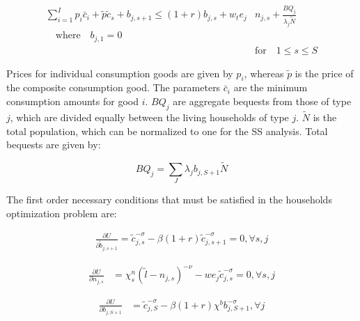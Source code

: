 \documentclass[letterpaper,12pt]{article}
\theoremstyle{definition}
\begin{document}
\begin{spacing}{1.5}
     \begin{equation}\label{EqBC}
      \begin{split}
        \sum_{i=1}^{I} p_{i}\bar{c}_{i} + \tilde{p}\tilde{c}_{s} + b_{j,s+1} \leq \left(1 + r\right) b_{j,s} + w_t e_{j}&n_{j,s} + \frac{BQ_{j}}{\lambda_j\tilde{N}} \\
        \quad\text{where}\quad b_{j,1} = 0 \\
        &\text{for} \quad 1\leq s \leq S 
      \end{split}
    \end{equation}
    
  Prices for individual consumption goods are given by $p_{i}$, whereas $\tilde{p}$ is the price of the composite consumption good.  The parameters $\bar{c}_{i}$ are the minimum consumption amounts for good $i$.  $BQ_{j}$ are aggregate bequests from those of type $j$, which are divided equally between the living households of type $j$.  $\tilde{N}$ is the total population, which can be normalized to one for the SS analysis.  Total bequests are given by:
  
  \begin{equation}
  BQ_{j} = \sum_{J} \lambda_{j}b_{j,S+1}\tilde{N}
  \end{equation}
  
 The first order necessary conditions that must be satisfied in the households optimization problem are:
  
      \begin{equation}\label{Eqbfoc}
      \begin{split}
     \frac{\partial U}{\partial \tilde{b}_{j,s+1}}  = \tilde{c}_{j,s}^{-\sigma} - \beta (1+r) \tilde{c}_{j,s+1}^{-\sigma}  = 0, \forall s, j
        \end{split}
    \end{equation}

    \begin{equation}\label{Eqnfoc}
      \begin{split}
      \frac{\partial U}{\partial n_{j,s}} & =  \chi^n_{s}\left(\tilde{l}-n_{j,s}\right)^{-\nu} - we_{j}\tilde{c}_{j,s}^{-\sigma} = 0, \forall s, j       
      \end{split}
    \end{equation}

    \begin{equation}\label{Eqbqfoc}
      \begin{split}
      \frac{\partial U}{\partial b_{j,S+1}} & = \tilde{c}_{j,S}^{-\sigma} - \beta (1+r) \chi^{b} b_{j,S+1}^{-\sigma}, \forall j
      \end{split}
    \end{equation}
  

\end{spacing}
\end{document}
